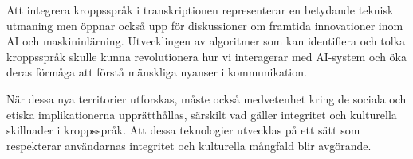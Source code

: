 Att integrera kroppsspråk i transkriptionen representerar en betydande teknisk
utmaning men öppnar också upp för diskussioner om framtida innovationer inom
AI och maskininlärning. Utvecklingen av algoritmer som kan identifiera och
tolka kroppsspråk skulle kunna revolutionera hur vi interagerar med AI-system
och öka deras förmåga att förstå mänskliga nyanser i kommunikation.

När dessa nya territorier utforskas, måste också medvetenhet kring de sociala
och etiska implikationerna upprätthållas, särskilt vad gäller integritet och
kulturella skillnader i kroppsspråk. Att dessa teknologier utvecklas på ett
sätt som respekterar användarnas integritet och kulturella mångfald blir
avgörande.
